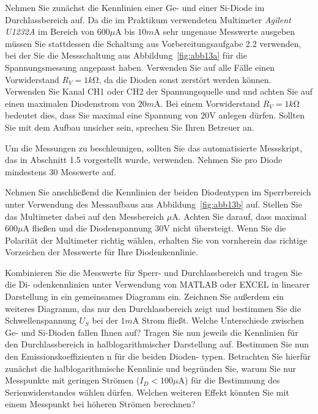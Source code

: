 \documentclass[10pt]{scrreprt}
\begin{document}
    Nehmen Sie zunächst die Kennlinien einer Ge- und einer Si-Diode im Durchlassbereich
    auf. Da die im Praktikum verwendeten Multimeter \textit{Agilent U1232A} im Bereich von $600\si{\mu \ampere}$
    bis $10\si{m\ampere}$ sehr ungenaue Messwerte ausgeben müssen Sie stattdessen die Schaltung aus
    Vorbereitungsaufgabe 2.2 verwenden, bei der Sie die Messschaltung aus Abbildung~\ref{fig:abb13a}
    für die Spannungsmessung angepasst haben. Verwenden Sie auf alle Fälle einen Vorwiderstand
    $R_V = 1\si{k\ohm}$, da die Dioden sonst zerstört werden können. Verwenden Sie Kanal CH1
    oder CH2 der Spannungsquelle und und achten Sie auf einen maximalen Diodenstrom
    von $20\si{m\ampere}$. Bei einem Vorwiderstand $R_V = 1\si{k\ohm}$ bedeutet dies, dass Sie maximal eine
    Spannung von $20\si{\volt}$ anlegen dürfen. Sollten Sie mit dem Aufbau unsicher sein, sprechen
    Sie Ihren Betreuer an.

    Um die Messungen zu beschleunigen, sollten Sie das automatisierte Messskript, das in
    Abschnitt 1.5 vorgestellt wurde, verwenden. Nehmen Sie pro Diode mindestens 30 Messwerte
    auf.

    Nehmen Sie anschließend die Kennlinien der beiden Diodentypen im Sperrbereich unter
    Verwendung des Messaufbaus aus Abbildung~\ref{fig:abb13b} auf. Stellen Sie das Multimeter dabei
    auf den Messbereich $\si{\mu \ampere}$. Achten Sie darauf, dass maximal $600\si{\mu \ampere}$ fließen und die
    Diodenspannung $30\si{\volt}$ nicht übersteigt. Wenn Sie die Polarität der Multimeter richtig wählen,
    erhalten Sie von vornherein das richtige Vorzeichen der Messwerte für Ihre Diodenkennlinie.

    Kombinieren Sie die Messwerte für Sperr- und Durchlassbereich und tragen Sie die Di-
    odenkennlinien unter Verwendung von MATLAB oder EXCEL in linearer Darstellung in
    ein gemeinsames Diagramm ein. Zeichnen Sie außerdem ein weiteres Diagramm, das nur
    den Durchlassbereich zeigt und bestimmen Sie die Schwellenspannung $U_S$ bei der $1\si{m\ampere}$
    Strom fließt. Welche Unterschiede zwischen Ge- und Si-Dioden fallen Ihnen auf?
    Tragen Sie nun jeweils die Kennlinien für den Durchlassbereich in halblogarithmischer
    Darstellung auf. Bestimmen Sie nun den Emissionskoeffizienten n für die beiden Dioden-
    typen. Betrachten Sie hierfür zunächst die halblogarithmische Kennlinie und begründen
    Sie, warum Sie nur Messpunkte mit geringen Strömen ($I_D < 100\si{\mu\ampere}$) für die Bestimmung
    des Serienwiderstandes wählen dürfen. Welchen weiteren Effekt könnten Sie mit einem
    Messpunkt bei höheren Strömen berechnen?
\end{document}
